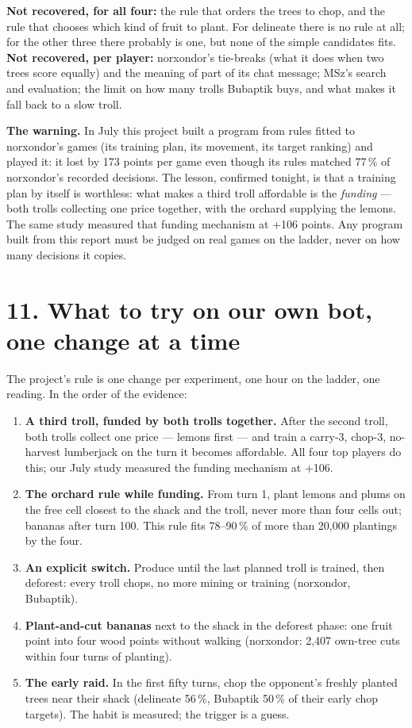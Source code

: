 \documentclass[10pt,a4paper]{article}
\begin{document}
\textbf{Not recovered, for all four:} the rule that orders the trees to chop, and the rule that chooses which kind of fruit to plant. For delineate there is no rule at all; for the other three there probably is one, but none of the simple candidates fits. \textbf{Not recovered, per player:} norxondor's tie-breaks (what it does when two trees score equally) and the meaning of part of its chat message; MSz's search and evaluation; the limit on how many trolls Bubaptik buys, and what makes it fall back to a slow troll.

\textbf{The warning.} In July this project built a program from rules fitted to norxondor's games (its training plan, its movement, its target ranking) and played it: it lost by 173 points per game even though its rules matched 77\,\% of norxondor's recorded decisions. The lesson, confirmed tonight, is that a training plan by itself is worthless: what makes a third troll affordable is the \emph{funding} --- both trolls collecting one price together, with the orchard supplying the lemons. The same study measured that funding mechanism at +106 points. Any program built from this report must be judged on real games on the ladder, never on how many decisions it copies.

\section*{11. What to try on our own bot, one change at a time}

The project's rule is one change per experiment, one hour on the ladder, one reading. In the order of the evidence:

\begin{enumerate}
\item \textbf{A third troll, funded by both trolls together.} After the second troll, both trolls collect one price --- lemons first --- and train a carry-3, chop-3, no-harvest lumberjack on the turn it becomes affordable. All four top players do this; our July study measured the funding mechanism at +106.
\item \textbf{The orchard rule while funding.} From turn 1, plant lemons and plums on the free cell closest to the shack and the troll, never more than four cells out; bananas after turn 100. This rule fits 78--90\,\% of more than 20,000 plantings by the four.
\item \textbf{An explicit switch.} Produce until the last planned troll is trained, then deforest: every troll chops, no more mining or training (norxondor, Bubaptik).
\item \textbf{Plant-and-cut bananas} next to the shack in the deforest phase: one fruit point into four wood points without walking (norxondor: 2,407 own-tree cuts within four turns of planting).
\item \textbf{The early raid.} In the first fifty turns, chop the opponent's freshly planted trees near their shack (delineate 56\,\%, Bubaptik 50\,\% of their early chop targets). The habit is measured; the trigger is a guess.
\end{enumerate}
\end{document}
